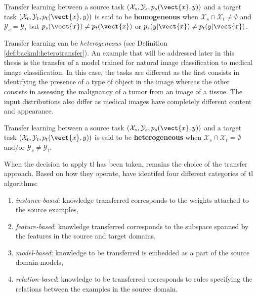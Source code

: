 \begin{definition}
\label{def:backml:homotransfer}
Transfer learning between a source task $\left(\mathcal{X}_{s}, \mathcal{Y}_{s}, p_{s}(\vect{x}, y)\right)$ and a target task $\left(\mathcal{X}_t, \mathcal{Y}_t, p_t(\vect{x}, y)\right)$ is said to be \textbf{homogeneous} when $\mathcal{X}_s \cap \mathcal{X}_t \neq \emptyset$ and $\mathcal{Y}_s = \mathcal{Y}_t$ but $p_s(\vect{x}) \neq p_t(\vect{x})$ or $p_s(y|\vect{x}) \neq p_t(y|\vect{x})$. 
\end{definition}

Transfer learning can be \textit{heterogeneous} (see Definition \ref{def:backml:heterotransfer}). An example that will be addressed later in this thesis is the transfer of a model trained for natural image classification to medical image classification. In this case, the tasks are different as the first consists in identifying the presence of a type of object in the image whereas the other consists in assessing the malignancy of a tumor from an image of a tissue. The input distributions also differ as medical images have completely different content and appearance.  

\begin{definition}
\label{def:backml:heterotransfer}
Transfer learning between a source task $\left(\mathcal{X}_{s}, \mathcal{Y}_{s}, p_{s}(\vect{x}, y)\right)$ and a target task $\left(\mathcal{X}_t, \mathcal{Y}_t, p_t(\vect{x}, y)\right)$ is said to be \textbf{heterogeneous} when $\mathcal{X}_s \cap \mathcal{X}_t = \emptyset$ and/or $\mathcal{Y}_s \neq \mathcal{Y}_t$.
\end{definition}

When the decision to apply \acrlong{tl} has been taken, remains the choice of the transfer approach. Based on how they operate, \parencite{yang2020transfer} have identifed four different categories of \acrlong{tl} algorithms: 

\begin{enumerate}
  \item \textit{instance-based}: knowledge transferred corresponds to the weights attached to the source examples,
  \item \textit{feature-based}: knowledge transferred corresponds to the subspace spanned by the features in the source and target domains,
  \item \textit{model-based}: knowledge to be transferred is embedded as a part of the source domain models,
  \item \textit{relation-based}: knowledge to be transferred corresponds to rules specifying the relations between the examples in the source domain. 
\end{enumerate}


